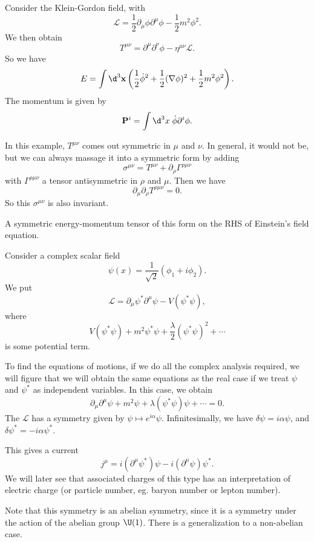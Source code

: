 \documentclass[a4paper]{article}
\begin{document}
\begin{eg}
  Consider the Klein-Gordon field, with
  \[
    \mathcal{L} = \frac{1}{2} \partial_\mu \phi \partial^\mu \phi - \frac{1}{2}m^2 \phi^2.
  \]
  We then obtain
  \[
    T^{\mu\nu} = \partial^\mu \partial^\nu \phi - \eta^{\mu\nu} \mathcal{L}.
  \]
  So we have
  \[
    E = \int \d^3 \mathbf{x} \left(\frac{1}{2}\dot{\phi}^2 + \frac{1}{2}(\nabla \phi)^2 + \frac{1}{2}m^2 \phi^2\right).
  \]
  The momentum is given by
  \[
    \mathbf{P}^i = \int\d^3 x\; \dot{\phi} \partial^i \phi.
  \]
\end{eg}
In this example, $T^{\mu\nu}$ comes out symmetric in $\mu$ and $\nu$. In general, it would not be, but we can always massage it into a symmetric form by adding
\[
  \sigma^{\mu\nu} = T^{\mu\nu} + \partial_\rho \Gamma^{\rho\mu\nu}
\]
with $\Gamma^{\rho\mu\nu}$ a tensor antisymmetric in $\rho$ and $\mu$. Then we have
\[
  \partial_\mu \partial_\rho T^{\rho\mu\nu} = 0.
\]
So this $\sigma^{\mu\nu}$ is also invariant.

A symmetric energy-momentum tensor of this form on the RHS of Einstein's field equation.

\begin{eg}
  Consider a complex scalar field
  \[
    \psi(x) = \frac{1}{\sqrt{2}} (\phi_1 + i \phi_2).
  \]
  We put
  \[
    \mathcal{L} = \partial_\mu \psi^* \partial^\mu \psi - V(\psi^*\psi),
  \]
  where
  \[
    V (\psi^*\psi) + m^2 \psi^* \psi + \frac{\lambda}{2}(\psi^*\psi)^2 + \cdots
  \]
  is some potential term.

  To find the equations of motions, if we do all the complex analysis required, we will figure that we will obtain the same equations as the real case if we treat $\psi$ and $\psi^*$ as independent variables. In this case, we obtain
  \[
    \partial_\mu \partial^\mu \psi + m^2 \psi + \lambda (\psi^*\psi) \psi + \cdots = 0.
  \]
  The $\mathcal{L}$ has a symmetry given by $\psi \mapsto e^{i\alpha} \psi$. Infinitesimally, we have $\delta \psi = i\alpha \psi$, and $\delta \psi^* = -i\alpha \psi^*$.

  This gives a current
  \[
    j^\mu = i(\partial^\mu \psi^*) \psi - i (\partial^\mu \psi)\psi^*.
  \]
  We will later see that associated charges of this type has an interpretation of electric charge (or particle number, eg. baryon number or lepton number).
\end{eg}

Note that this symmetry is an abelian symmetry, since it is a symmetry under the action of the abelian group $\U(1)$. There is a generalization to a non-abelian case.
\end{document}
